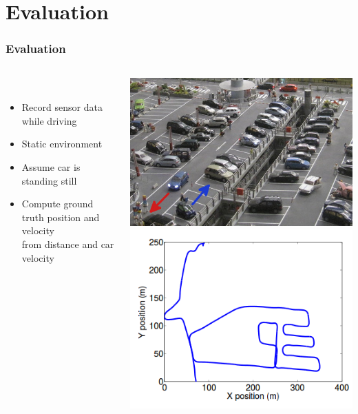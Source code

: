 \section{Evaluation}
\begin{frame}
  \frametitle{Evaluation}
  \begin{columns}
  \begin{column}{0.6\textwidth}
  \begin{description}[]
  \item[Relative Reference Frame Approach] \hfill \\
  \begin{itemize}
  \item Record sensor data while driving
  \item Static environment
  \item Assume car is standing still
  \pause
  \item Compute ground truth position and velocity\\ from distance and car velocity
  \end{itemize}
  \end{description}
  \end{column}
  \begin{column}{0.4\textwidth}
  \includegraphics[width=\textwidth]{images/parking}\\
  \includegraphics[width=\textwidth]{images/rel-ref-frame-path}

\end{column}
\end{columns}
\end{frame}

